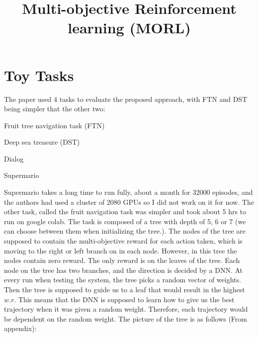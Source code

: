 \documentclass[11pt,onecolumn]{IEEEtran}
\begin{document}
%
%
%          
%
%   
% 
    

\title{Multi-objective Reinforcement learning (MORL)}


\maketitle
\section*{\centering\textbf{Toy Tasks}}
The paper used 4 tasks to evaluate the proposed approach, with FTN and DST being simpler that the other two:

\begin{itemize}{
\item Fruit tree navigation task (FTN)
\item Deep sea treasure (DST)
\item Dialog
\item Supermario
}\end{itemize}


Supermario takes a long time to run fully, about a month for 32000 episodes, and the authors had used a cluster of 2080 GPUs so I did not work on it for now. The other task, called the fruit navigation task was simpler and took about 5 hrs to run on google colab. The task is composed of a tree with depth of 5, 6 or 7 (we can choose between them when initializing the tree.). The nodes of the tree are supposed to contain the multi-objective reward for each action taken, which is moving to the right or left branch on in each node. However, in this tree the nodes contain zero reward. The only reward is on the leaves of the tree. Each node on the tree has two branches, and the direction is decided by a DNN. At every run when testing the system, the tree picks a random vector of weights. Then the tree is supposed to guide us to a leaf that would result in the highest $w.r$. This means that the DNN is supposed to learn how to give us the best trajectory when it was given a random weight. Therefore, each trajectory would be dependent on the random weight. 
The picture of the tree is as follows (From \cite{yang2019generalized} appendix):
\end{document}

